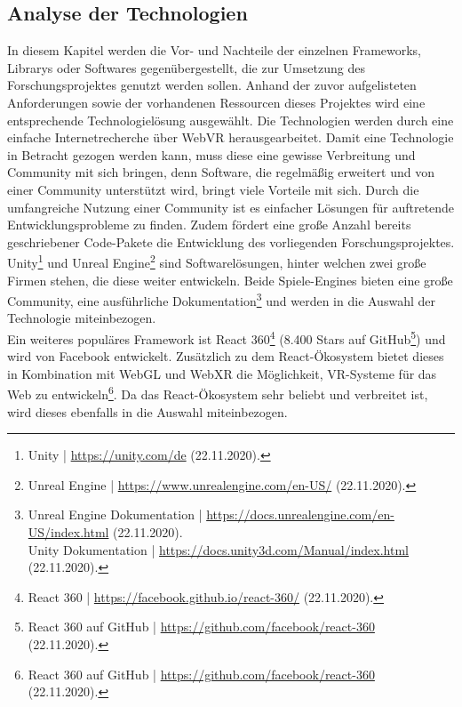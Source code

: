 \documentclass[a4paper,12pt,oneside]{article}
\begin{document}
    \subsection{Analyse der Technologien}
      In diesem Kapitel werden die Vor- und Nachteile der einzelnen Frameworks, Librarys
      oder Softwares gegenübergestellt, die zur Umsetzung des Forschungsprojektes genutzt
      werden sollen. Anhand der zuvor aufgelisteten Anforderungen sowie der vorhandenen
      Ressourcen dieses Projektes wird eine entsprechende Technologielösung 
      ausgewählt.
      Die Technologien werden durch eine einfache Internetrecherche
      über WebVR herausgearbeitet.
      Damit eine Technologie in Betracht gezogen werden kann, muss diese eine gewisse
      Verbreitung und Community mit sich bringen, denn Software, die regelmäßig erweitert
      und von einer Community unterstützt wird, bringt viele Vorteile mit sich. 
      Durch die umfangreiche Nutzung einer Community ist es einfacher Lösungen
      für auftretende Entwicklungsprobleme zu finden. Zudem fördert eine große
      Anzahl bereits geschriebener Code-Pakete die Entwicklung des vorliegenden 
      Forschungsprojektes. \\
      Unity\footnote{Unity | \url{https://unity.com/de} (22.11.2020).} und 
      Unreal Engine\footnote{Unreal Engine | \url{https://www.unrealengine.com/en-US/} (22.11.2020).} 
      sind Softwarelösungen, hinter welchen zwei große
      Firmen stehen, die diese weiter entwickeln. Beide Spiele-Engines bieten eine
      große Community, eine ausführliche Dokumentation\footnote{Unreal Engine Dokumentation | \url{https://docs.unrealengine.com/en-US/index.html} (22.11.2020).\\Unity Dokumentation | \url{https://docs.unity3d.com/Manual/index.html} (22.11.2020).}
      und werden in die Auswahl der Technologie miteinbezogen. \\
      Ein weiteres populäres Framework ist React 360\footnote{React 360 | \url{https://facebook.github.io/react-360/} (22.11.2020).}
      (8.400 Stars auf GitHub\footnote{React 360 auf GitHub | \url{https://github.com/facebook/react-360} (22.11.2020).})
      und wird von Facebook entwickelt. 
      Zusätzlich zu dem React-Ökosystem bietet dieses in Kombination mit WebGL und WebXR
      die Möglichkeit, VR-Systeme für das Web zu entwickeln\footnote{React 360 auf GitHub | \url{https://github.com/facebook/react-360} (22.11.2020).}.      
      Da das React-Ökosystem sehr beliebt und verbreitet
      ist, wird dieses ebenfalls in die Auswahl miteinbezogen.\\
\end{document}
